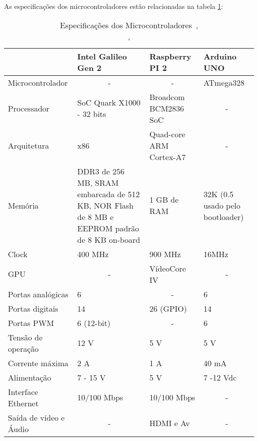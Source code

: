 As especificações dos microcontroladores estão relacionadas na tabela \ref{table:microprocessadores}:

\begin{table}[H]
\centering
\caption[Especificações dos microcontroladores]{Especificações dos Microcontroladores~\cite{intelGalileo},\\\cite{rsppi}, \cite{arduino}}
\begin{tabular}{p{3cm}|p{3cm}|p{3cm}|p{3cm}|}
\cline{2-4}
 & Intel Galileo Gen 2 & Raspberry PI 2 & Arduino UNO \\ \hline
\multicolumn{1}{|l|}{Microcontrolador} & \multicolumn{1}{c|}{-} & \multicolumn{1}{c|}{-} & ATmega328 \\ \hline
\multicolumn{1}{|l|}{Processador} & SoC Quark X1000 - 32 bits & Broadcom BCM2836 SoC & \multicolumn{1}{c|}{-} \\ \hline
\multicolumn{1}{|l|}{Arquitetura} & x86 & Quad-core ARM Cortex-A7 & \multicolumn{1}{c|}{-} \\ \hline
\multicolumn{1}{|l|}{Memória} & DDR3 de 256 MB, SRAM embarcada de 512 KB, NOR Flash de 8 MB e EEPROM padrão de 8 KB on-board & 1 GB de RAM & 32K (0.5 usado pelo bootloader) \\ \hline
\multicolumn{1}{|l|}{Clock} & 400 MHz & 900 MHz & 16MHz \\ \hline
\multicolumn{1}{|l|}{GPU} & \multicolumn{1}{c|}{-} & VídeoCore IV & \multicolumn{1}{c|}{-} \\ \hline
\multicolumn{1}{|l|}{Portas analógicas} & 6 & \multicolumn{1}{c|}{-} & 6 \\ \hline
\multicolumn{1}{|l|}{Portas digitais} & 14 & 26 (GPIO) & 14 \\ \hline
\multicolumn{1}{|l|}{Portas PWM} & 6 (12-bit) & \multicolumn{1}{c|}{-} & 6 \\ \hline
\multicolumn{1}{|l|}{Tensão de operação} & 12 V & 5 V & 5 V \\ \hline
\multicolumn{1}{|l|}{Corrente máxima} & 2 A & 1 A & 40 mA \\ \hline
\multicolumn{1}{|l|}{Alimentação} & 7 - 15 V & 5 V & 7 -12 Vdc \\ \hline
\multicolumn{1}{|l|}{Interface Ethernet} & 10/100 Mbps & 10/100 Mbps & \multicolumn{1}{c|}{-} \\ \hline
\multicolumn{1}{|l|}{Saída de vídeo e Áudio} & \multicolumn{1}{c|}{-} & HDMI e Av & \multicolumn{1}{c|}{-} \\ \hline
\end{tabular}
\label{table:microprocessadores}
\end{table}

